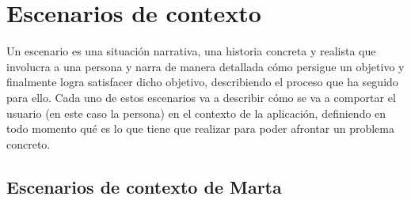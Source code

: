 
\section{Escenarios de contexto}
Un escenario es una situación narrativa, una historia concreta y realista que
involucra a una persona y narra de manera detallada cómo persigue un objetivo y
finalmente logra satisfacer dicho objetivo, describiendo el proceso que ha
seguido para ello. Cada uno de estos escenarios va a describir cómo se va a
comportar el usuario (en este caso la persona) en el contexto de la aplicación,
definiendo en todo momento qué es lo que tiene que realizar para poder afrontar
un problema concreto.
\subsection{Escenarios de contexto de Marta}
